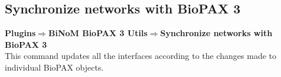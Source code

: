 \subsection{Synchronize networks with BioPAX 3}
\textbf{Plugins$\Rightarrow$BiNoM BioPAX 3 Utils$\Rightarrow$Synchronize networks with BioPAX 3}\\
This command updates all the interfaces according to the changes made to individual BioPAX objects.
